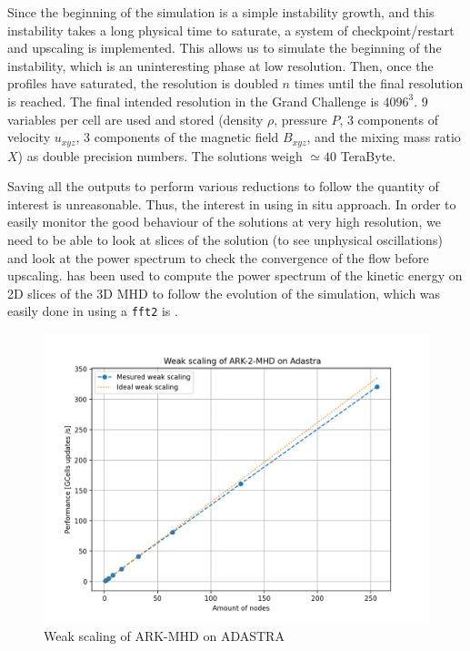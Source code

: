 Since the beginning of the simulation is a simple instability growth, and this instability takes a long physical time to saturate, a system of checkpoint/restart and upscaling is implemented. This allows us to simulate the beginning of the instability, which is an uninteresting phase at low resolution. Then, once the profiles have saturated, the resolution is doubled $n$ times until the final resolution is reached. 
The final intended resolution in the Grand Challenge is $4096^3$. $9$ variables per cell are used and stored (density $\rho$, pressure $P$, 3 components of velocity $u_{xyz}$, 3 components of the magnetic field $B_{xyz}$, and the mixing mass ratio $X$) as double precision numbers. The solutions weigh $\simeq 40$ TeraByte. 

Saving all the outputs to perform various reductions to follow the quantity of interest is unreasonable. Thus, the interest in using in situ approach. 
In order to easily monitor the good behaviour of the solutions at very high resolution, we need to be able to look at slices of the solution (to see unphysical oscillations) and look at the power spectrum to check  the convergence of the flow before upscaling.
\deisa has been used to compute the power spectrum of the kinetic energy on 2D slices of the 3D MHD to follow the evolution of the simulation, which was easily done in \deisa using a \texttt{fft2} is \dask. 


\begin{figure}
    \centering
    \includegraphics[scale=0.5]{figures/perfs_WS_line.png}
    \caption{Weak scaling of ARK-MHD on ADASTRA }
    \label{fig:perf_WS_line.png}
\end{figure}


